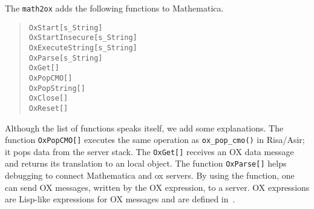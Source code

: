 The {\tt math2ox} adds the following functions to Mathematica.
\begin{quote}
{\tt OxStart[s\_String]} \\
{\tt OxStartInsecure[s\_String]} \\
{\tt OxExecuteString[s\_String]}  \\
{\tt OxParse[s\_String]} \\
{\tt OxGet[]} \\
{\tt OxPopCMO[]} \\
{\tt OxPopString[]} \\
{\tt OxClose[]} \\
{\tt OxReset[]}
\end{quote}
Although the list of functions speaks itself,
we add some explanations.
The function {\tt OxPopCMO[]} executes the same operation
as {\tt ox\_pop\_cmo()} in Risa/Asir;
it pops data from the server stack.
The {\tt OxGet[]} receives an OX data message
and returns its translation to an local object.
The function {\tt OxParse[]} helps debugging to connect Mathematica
and ox servers.
By using the function, one can send OX messages,
written by the OX expression, to a server. 
OX expressions are Lisp-like expressions for OX messages and are defined
in~\cite{noro-takayama}.  

